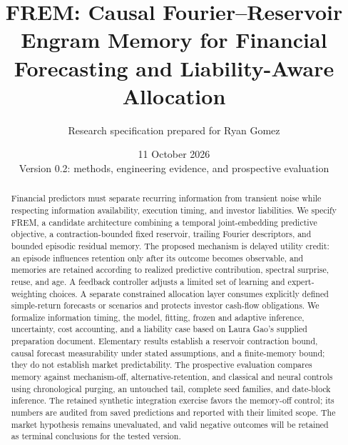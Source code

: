 \documentclass[11pt,a4paper]{article}
\title{FREM: Causal Fourier--Reservoir Engram Memory for Financial Forecasting and Liability-Aware Allocation}
\author{Research specification prepared for Ryan Gomez}
\date{11 October 2026\\Version 0.2: methods, engineering evidence, and prospective evaluation}
\begin{document}
\maketitle
\begin{center}
\end{center}

\begin{abstract}
Financial predictors must separate recurring information from transient noise while respecting information availability, execution timing, and investor liabilities. We specify FREM, a candidate architecture combining a temporal joint-embedding predictive objective, a contraction-bounded fixed reservoir, trailing Fourier descriptors, and bounded episodic residual memory. The proposed mechanism is delayed utility credit: an episode influences retention only after its outcome becomes observable, and memories are retained according to realized predictive contribution, spectral surprise, reuse, and age. A feedback controller adjusts a limited set of learning and expert-weighting choices. A separate constrained allocation layer consumes explicitly defined simple-return forecasts or scenarios and protects investor cash-flow obligations. We formalize information timing, the model, fitting, frozen and adaptive inference, uncertainty, cost accounting, and a liability case based on Laura Gao's supplied preparation document. Elementary results establish a reservoir contraction bound, causal forecast measurability under stated assumptions, and a finite-memory bound; they do not establish market predictability. The prospective evaluation compares memory against mechanism-off, alternative-retention, and classical and neural controls using chronological purging, an untouched tail, complete seed families, and date-block inference. The retained synthetic integration exercise favors the memory-off control; its numbers are audited from saved predictions and reported with their limited scope. The market hypothesis remains unevaluated, and valid negative outcomes will be retained as terminal conclusions for the tested version.
\end{abstract}
\newpage
\begingroup
\small
\setlength{\parskip}{0pt}
\tableofcontents
\endgroup
\newpage
\end{document}
